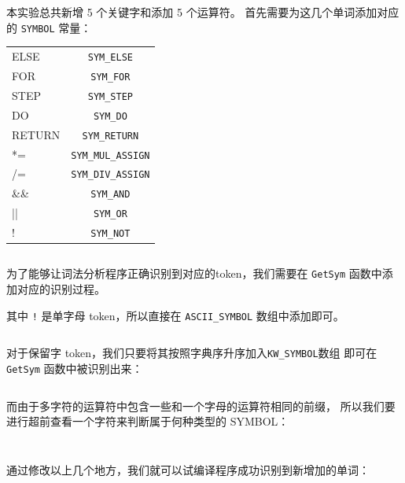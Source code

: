 \documentclass[]{guo}
\begin{document}
本实验总共新增 5 个关键字和添加 5 个运算符。
首先需要为这几个单词添加对应的 \texttt{SYMBOL} 常量：

\begin{table}[H]
    \centering
    \begin{tabular}{l c}
        ELSE & \texttt{SYM_ELSE} \\
        FOR & \texttt{SYM_FOR} \\
        STEP & \texttt{SYM_STEP} \\
        DO & \texttt{SYM_DO} \\
        RETURN & \texttt{SYM_RETURN} \\
        *= & \texttt{SYM_MUL_ASSIGN} \\
        /= & \texttt{SYM_DIV_ASSIGN} \\
        \&\& & \texttt{SYM_AND} \\
        || & \texttt{SYM_OR} \\
        ! & \texttt{SYM_NOT} \\
    \end{tabular}
\end{table}

\inputminted[baselinestretch=0.75,firstline=82,lastline=100,fontsize=\fontlm]{cpp}{Unit1.cpp}

为了能够让词法分析程序正确识别到对应的token，我们需要在 \texttt{GetSym}
函数中添加对应的识别过程。

其中 \texttt{!} 是单字母 token，所以直接在 \texttt{ASCII_SYMBOL}
数组中添加即可。

\inputminted[baselinestretch=0.75,firstline=2496,lastline=2497,fontsize=\fontlm]{cpp}{Unit1.cpp}

对于保留字 token，我们只要将其按照字典序升序加入\texttt{KW_SYMBOL}数组
即可在 \texttt{GetSym} 函数中被识别出来：

\inputminted[baselinestretch=0.75,firstline=2526,lastline=2537,fontsize=\fontlm]{cpp}{Unit1.cpp}

而由于多字符的运算符中包含一些和一个字母的运算符相同的前缀，
所以我们要进行超前查看一个字符来判断属于何种类型的 SYMBOL：

\inputminted[baselinestretch=0.75,firstline=514,lastline=522,fontsize=\fontlm]{cpp}{Unit1.cpp}
\inputminted[baselinestretch=0.75,firstline=586,lastline=595,fontsize=\fontlm]{cpp}{Unit1.cpp}

通过修改以上几个地方，我们就可以试编译程序成功识别到新增加的单词：
\end{document}
